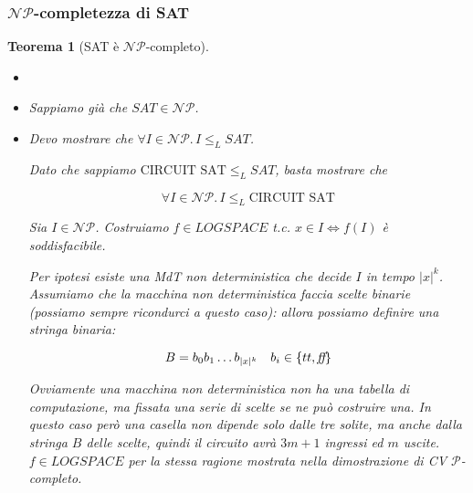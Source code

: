 \documentclass[a4paper,10pt,oneside]{article}
\theoremstyle{break}
\newtheorem{teo}{Teorema}[subsection]
\begin{document}
\subsubsection{$\mathcal{NP}$-completezza di SAT }
\begin{mdframed}
 
\begin{teo}[SAT è $\mathcal{NP}$-completo]
\begin{itemize}
 \item []
 \item Sappiamo già che $SAT \in \mathcal{NP}$.
 \item Devo mostrare che $\forall I \in \mathcal {NP}.\, I \leq_L SAT$. 
 
 Dato che sappiamo $\text{CIRCUIT SAT} \leq_L SAT$, basta mostrare che 
 
 \[\forall I\in \mathcal {NP}.\,I \leq_L \text{CIRCUIT SAT}\]
 
 Sia $I \in \mathcal {NP}$. Costruiamo $f \in LOGSPACE$ t.c. $x \in I \iff f(I)$ è soddisfacibile. \smallskip
 
 Per ipotesi esiste una MdT non deterministica che decide $I$ in tempo $|x|^k$. Assumiamo che la macchina non deterministica faccia scelte binarie (possiamo sempre ricondurci a questo caso): allora possiamo definire una stringa binaria:
 
 \[ B = b_0b_1\hdots b_{|x|^k}\quad b_i \in \{tt, \emph{ff}\}\]
 
 Ovviamente una macchina non deterministica non ha una tabella di computazione, ma fissata una serie di scelte se ne può costruire una. In questo caso però una casella non dipende solo dalle tre solite, ma anche dalla stringa $B$ delle scelte, quindi il circuito avrà $3m + 1$ ingressi ed $m$ uscite. $f \in LOGSPACE$ per la stessa ragione mostrata nella dimostrazione di CV $\mathcal P$-completo.
\end{itemize}

\end{teo}

\end{mdframed}
\end{document}
